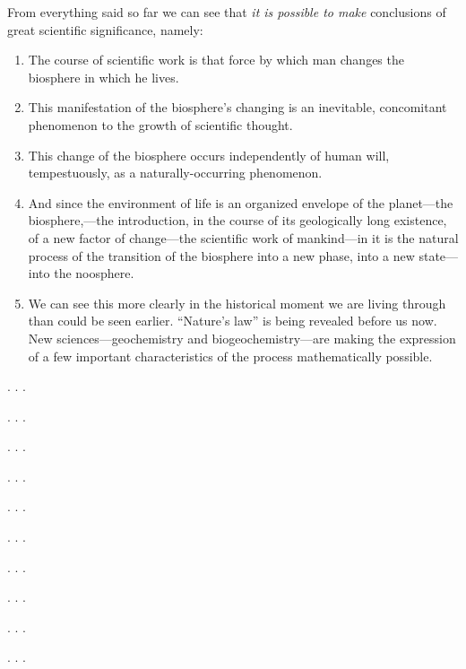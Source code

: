 \Section %
From everything said so far we can see that \emph{it is possible to make}
conclusions of great scientific significance, namely:
\begin{enumerate}
  \item The course of scientific work is that force by which man changes the
  	biosphere in which he lives.
  \item This manifestation of the biosphere's changing is an inevitable,
  	concomitant phenomenon to the growth of scientific thought.
  \item This change of the biosphere occurs independently of human will,
  	tempestuously, as a naturally-occurring phenomenon.
  \item And since the environment of life is an organized envelope of the
  	planet---the biosphere,---the introduction, in the course of its
	geologically long existence, of a new factor of change---the scientific
	work of mankind---in it is the natural process of the transition of the
	biosphere into a new phase, into a new state---into the noosphere.
  \item We can see this more clearly in the historical moment we are living
  	through than could be seen earlier.  ``Nature's law'' is being revealed
	before us now.  New sciences---geochemistry and biogeochemistry---are
	making the expression of a few important characteristics of the process
	mathematically possible.
\end{enumerate}


\Section %

. . .

\Section %

. . .

\Section %

. . .

\Section %

. . .

\Section %

. . .

\Section %

. . .

\Section %

. . .

\Section %

. . .

\Section %

. . .

\Section %

. . .
